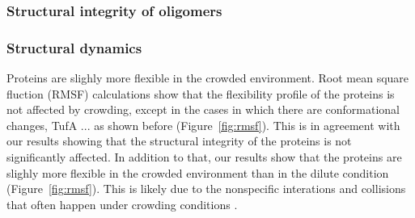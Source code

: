 \documentclass[journal=jacsat,manuscript=article]{achemso}
\begin{document}

\subsubsection{Structural integrity of oligomers}













\subsubsection{Structural dynamics}
Proteins are slighly more flexible in the crowded environment. Root mean square fluction (RMSF) calculations show that the flexibility profile of the proteins is not affected by crowding, except in the cases in which there are conformational changes, TufA ... as shown before (Figure~\ref{fig:rmsf}). This is in agreement with our results showing that the structural integrity of the proteins is not significantly affected. In addition to that, our results show that the proteins are slighly more flexible in the crowded environment than in the dilute condition (Figure~\ref{fig:rmsf}). This is likely due to the nonspecific interations and collisions that often happen under crowding conditions \textbf{\color{red}{REF}}.
\end{document}
